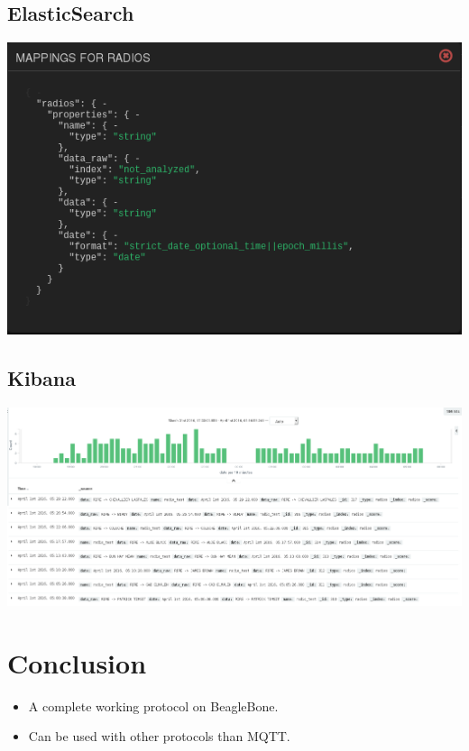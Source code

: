 \documentclass{beamer}
\begin{document}
\subsection{ElasticSearch}

\begin{frame}
	\begin{center}
		\includegraphics[scale=0.50]{mapping.png}
	\end{center}
\end{frame}

\subsection{Kibana}

\begin{frame}
	\begin{center}
		\includegraphics[scale=0.20]{frequence.png}
	\end{center}
\end{frame}

\section{Conclusion}

\begin{frame}
	\begin{itemize}
		\item A complete working protocol on BeagleBone.
		\item Can be used with other protocols than MQTT.
	\end{itemize}
\end{frame}
\end{document}
